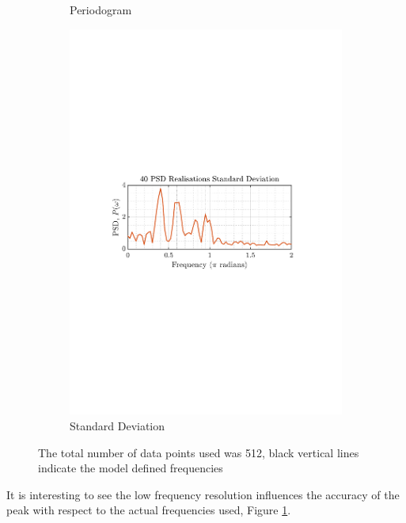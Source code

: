 \documentclass[12pt]{article}
\numberwithin{equation}{section}
\begin{document}
\begin{figure}[H]
\begin{subfigure}{0.49\textwidth}
			\captionsetup{justification=centering}
			\caption{Periodogram}
		\end{subfigure}
		\begin{subfigure}{0.49\textwidth}
			\centering
			\includegraphics[trim={2.2cm 11.2cm 3.15cm  11.2cm}, clip, width=\textwidth]{../MATLAB/figures/q1_3b_fig02.pdf} 
			\captionsetup{justification=centering}
			\caption{Standard Deviation}
		\end{subfigure}
		\captionsetup{justification=centering}
		\caption{The total number of data points used was 512, black vertical lines indicate the model defined frequencies}
		\label{fig: 1-3b}
	\end{figure}

	It is interesting to see the low frequency resolution influences the accuracy of the peak with respect to the actual frequencies used, Figure \ref{fig: 1-3b}.
\end{document}
